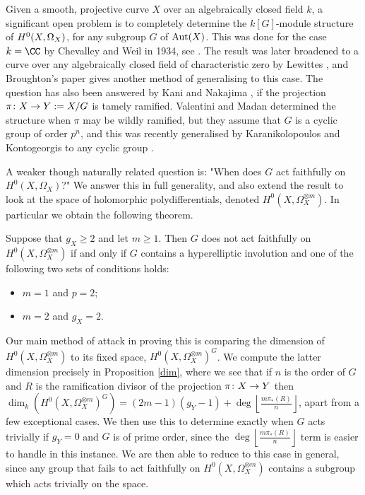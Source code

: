 Given a smooth, projective curve $X$ over an algebraically closed field $k$, a significant open problem is to completely determine the $k[G]$-module structure of ${H^0(X,\Omega_X)}$, for any subgroup $G$ of $\operatorname{Aut}(X)$.
This was done for the case $k = \CC$ by Chevalley and Weil in 1934, see \cite{chev}.
The result was later broadened to a curve over any algebraically closed field of characteristic zero by Lewittes \cite{lewittes}, and Broughton's paper \cite{broughton} gives another method of generalising to this case.
The question has also been answered by Kani \cite{Kani} and Nakajima \cite{naka2}, if the projection $\pi \colon X \rightarrow Y:= X/G$ is tamely ramified.
Valentini and Madan \cite{valmadan} determined the structure when $\pi$ may be wildly ramified, but they assume that $G$ is a cyclic group of order $p^n$, and this was recently generalised by Karanikolopoulos and Kontogeorgis to any cyclic group \cite{kako}.

A weaker though naturally related question is: "When does $G$ act faithfully on $H^0(X,\Omega_X)$?"
We answer this in full generality, and also extend the result to look at the space of holomorphic polydifferentials, denoted $H^0(X,\Omega_X^{\otimes m})$.
In particular we obtain the following theorem.
    \begin{unnumthm}
    Suppose that $g_X\geq 2$ and let $m\geq1$. 
    Then $G$ does not act faithfully on $H^0(X,\Omega_X^{\otimes m})$ if and only if $G$ contains a hyperelliptic involution and one of the following two sets of conditions holds:
    \vspace{-1em}
    \begin{itemize}
        \item $m=1$ and $p=2$;
        \item $m=2$ and $g_X=2$.
        \end{itemize}
    \end{unnumthm}

Our main method of attack in proving this is comparing the dimension of $H^0(X,\Omega_X^{\otimes m})$ to its fixed space, $H^0(X,\Omega_X^{\otimes m})^G$.
We compute the latter dimension precisely in Proposition \ref{dim}, where we see that if $n$ is the order of $G$ and $R$ is the ramification divisor of the projection $\pi \colon X \rightarrow Y$ then $ \dim_k \left( H^0(X,\Omega_X^{\otimes m})^G \right) = (2m-1)(g_Y-1) + \deg\left\lfloor\frac{m\pi_*(R)}{n} \right\rfloor$, apart from a few exceptional cases.
We then use this to determine exactly when $G$ acts trivially if $g_Y = 0$ and $G$ is of prime order, since the $\deg\left\lfloor\frac{m\pi_*(R)}{n} \right\rfloor$ term is easier to handle in this instance.
We are then able to reduce to this case in general, since any group that fails to act faithfully on $H^0(X,\Omega_X^{\otimes m})$ contains a subgroup which acts trivially on the space.


